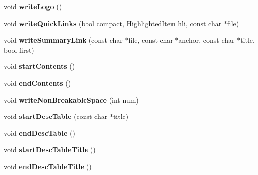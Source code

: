 \begin{DoxyCompactItemize}
\item 
\hypertarget{class_output_list_ac7d0ac7d2abfeba04c9c22a3974221ae}{void {\bfseries write\-Logo} ()}\label{class_output_list_ac7d0ac7d2abfeba04c9c22a3974221ae}

\item 
\hypertarget{class_output_list_aaabc3321e0f41d7c76fc03bfb77ca26a}{void {\bfseries write\-Quick\-Links} (bool compact, Highlighted\-Item hli, const char $\ast$file)}\label{class_output_list_aaabc3321e0f41d7c76fc03bfb77ca26a}

\item 
\hypertarget{class_output_list_a365f727475781694161eeed7a18c650d}{void {\bfseries write\-Summary\-Link} (const char $\ast$file, const char $\ast$anchor, const char $\ast$title, bool first)}\label{class_output_list_a365f727475781694161eeed7a18c650d}

\item 
\hypertarget{class_output_list_a4d02a081921a34660b9f11e7c32a303f}{void {\bfseries start\-Contents} ()}\label{class_output_list_a4d02a081921a34660b9f11e7c32a303f}

\item 
\hypertarget{class_output_list_a89af32c9958f2fc61301a25e7b3360c7}{void {\bfseries end\-Contents} ()}\label{class_output_list_a89af32c9958f2fc61301a25e7b3360c7}

\item 
\hypertarget{class_output_list_a288d1e41483923656614e1b96da0971c}{void {\bfseries write\-Non\-Breakable\-Space} (int num)}\label{class_output_list_a288d1e41483923656614e1b96da0971c}

\item 
\hypertarget{class_output_list_a6f7fc449c9d4d715c169881f1a54eea2}{void {\bfseries start\-Desc\-Table} (const char $\ast$title)}\label{class_output_list_a6f7fc449c9d4d715c169881f1a54eea2}

\item 
\hypertarget{class_output_list_aea3e3db6190b6ec4e0f5c3988cacb40c}{void {\bfseries end\-Desc\-Table} ()}\label{class_output_list_aea3e3db6190b6ec4e0f5c3988cacb40c}

\item 
\hypertarget{class_output_list_a5ab1218802d388186a056cba7ea439e2}{void {\bfseries start\-Desc\-Table\-Title} ()}\label{class_output_list_a5ab1218802d388186a056cba7ea439e2}

\item 
\hypertarget{class_output_list_a25c810f32509fa5a79d86d96a3d4a275}{void {\bfseries end\-Desc\-Table\-Title} ()}\label{class_output_list_a25c810f32509fa5a79d86d96a3d4a275}


\end{DoxyCompactItemize}
